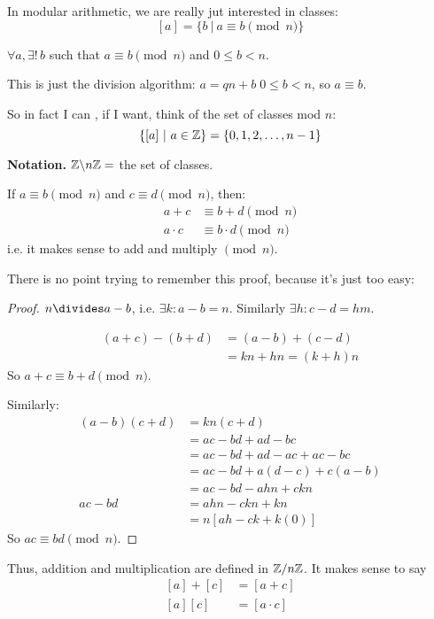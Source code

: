\documentclass[twoside]{scrartcl}
\begin{document}
In modular arithmetic, we are really jut interested in classes: 
\[[a] = \{b ~|~ a \equiv b \pmod{n}\}\]

\begin{remark}
$\forall a, \exists!\, b$ such that $a \equiv b \pmod{n}$ and $0 \leq b < n$. 	

This is just the division algorithm: $a = qn + b\; 0 \leq b < n$, so $ a \equiv b$. 
\end{remark}

So in fact I can , if I want, think of the set of classes mod $n$: 
\[\{[a] ~|~ a \in\mathbb{Z}\} = \{0,1,2,\dots, n-1\}\]

\textbf{Notation.} $\mathbb{Z} \backslash n\mathbb{Z} = $ the set of classes.\\

\begin{proposition}
If $a \equiv b \pmod{n}$ and $c \equiv d \pmod{n}$, then:
\[
\begin{aligned}
  a + c &\equiv b + d \pmod{n}\\
  a \cdot c &\equiv b \cdot d \pmod{n}
\end{aligned}
\]
i.e. it makes sense to add and multiply $\pmod{n}$. 
\end{proposition}

There is no point trying to remember this proof, because it's just too easy:
\begin{proof}
$n \divides a -b$, i.e. $\exists k: a-b = n$. Similarly $\exists h: c -d = hm$. 

\[
\begin{aligned}
  (a+c) - (b+d) &= (a-b) + (c-d)\\
  &= kn + hn = (k+h)n
\end{aligned}
\]
So $a+c \equiv b + d \pmod{n}$. 

Similarly: 
\[
\begin{aligned}
  (a-b)(c+d) &= kn(c+d)\\
  &= ac - bd + ad - bc\\
  &= ac - bd + ad - ac + ac - bc\\
  &= ac - bd + a(d-c) + c(a-b)\\
  &= ac - bd - ahn + ckn\\
  ac - bd &= ahn - ckn + kn \\
  &= n[ah - ck + k(0)]
\end{aligned}
\]
So $ac \equiv bd \pmod{n}$. 
\end{proof}


Thus, addition and multiplication are defined in $\mathbb{Z} / n\mathbb{Z}$. It makes sense to say 
\[
\begin{aligned}
  [a] + [c] &= [a + c]\\
  [a][c] &= [a \cdot c]
\end{aligned}
\]
\pagebreak
\end{document}
